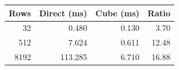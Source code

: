 \begin{tabular}{rrrr}
\toprule
Rows & Direct (ms) & Cube (ms) & Ratio \\
\midrule
32 & 0.480 & 0.130 & 3.70 \\
512 & 7.624 & 0.611 & 12.48 \\
8192 & 113.285 & 6.710 & 16.88 \\
\bottomrule
\end{tabular}
